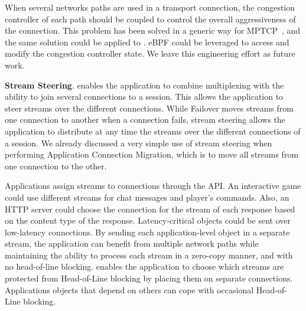 When several networks paths are used in a transport 
connection, the congestion controller of each path should be coupled to control 
the overall aggressiveness of the connection. This problem has been solved in a 
generic way for MPTCP~\cite{rfc6356}, and the same solution could be applied to 
\tcpls. eBPF could be leveraged to access and modify the congestion controller 
state. We leave this engineering effort as future work.

\textbf{Stream Steering}. \tcpls enables the application to combine 
multiplexing with the ability to join
several \tcp connections to a \tcpls session. This allows the application to 
steer \tcpls
streams over the different \tcp connections. While Failover moves
\tcpls streams from one connection to another when a \tcp connection fails, stream
steering allows the application to distribute at any time the streams over the 
different
\tcp connections of a \tcpls session. We already discussed a very simple use of
stream steering when performing Application Connection Migration, which is to 
move all streams from one connection to the other.


Applications assign \tcpls streams to \tcp connections through the \tcpls 
API.
An interactive game could use different streams for chat messages and player's 
commands.  Also, an HTTP server could choose
the \tcp connection for the stream of each response based on the content type of
the response. Latency-critical objects could be sent over
low-latency connections. By sending each application-level object in a separate
stream, the application can benefit from multiple network paths while
maintaining the ability to process each stream in a zero-copy manner, and
with no head-of-line blocking.
\tcpls enables the application to choose which streams are protected from 
Head-of-Line blocking by placing them on separate \tcp connections. 
Applications objects that depend on others can cope with occasional 
Head-of-Line blocking.


